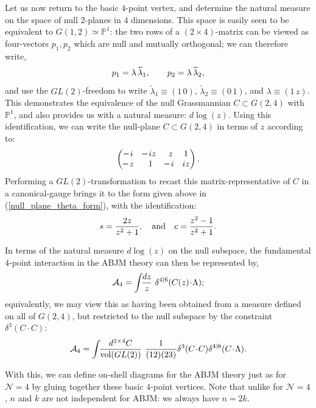 \documentclass[12pt,hyperref,compress]{JHEP3}
\newcommand{\eq}[1]{\begin{equation}#1\end{equation}}
\newcommand{\mi}{{\rm\rule[2.4pt]{6pt}{0.65pt}}}
\begin{document}
Let us now return to the basic $4$-point vertex, and determine the natural measure on the space of null $2$-planes in $4$ dimensions. This space is easily seen to be equivalent to $G(1,2)\simeq\mathbb{P}^1$: the two rows of a $(2\!\times\!4)$-matrix can be viewed as four-vectors $p_1, p_2$ which are null and mutually orthogonal; we can therefore write,
\vspace{-.2cm}\eq{p_1=\lambda\,\widetilde\lambda_1,\qquad p_2=\lambda\,\widetilde\lambda_2,\vspace{-.2cm}}
and use the $GL(2)$-freedom to write $\widetilde\lambda_1\equiv(1\,0)$, $\widetilde\lambda_2\equiv(0\,1)$, and $\lambda\equiv(1\,z)$. This demonstrates the equivalence of the null Grassmannian $C\!\subset\!G(2,4)$ with $\mathbb{P}^1$, and also provides us with a natural measure: $d\!\log(z)$. Using this identification, we can write the null-plane $C\!\subset\!G(2,4)$ in terms of $z$ according to:
\vspace{-.2cm}\eq{\left(\begin{array}{@{}cccc@{}}\mi\,i&\mi\,iz&\,\,z&1\\\mi\,z&\,\,1&\mi\,i&iz\end{array}\right).\vspace{-.2cm}}
Performing a $GL(2)$-transformation to recast this matrix-representative of $C$ in a canonical-gauge brings it to the form given above in (\ref{null_plane_theta_form}), with the identification:
\vspace{-.4cm}\eq{s=\frac{2z}{z^2+1},\quad\mathrm{and}\quad c=\frac{z^2-1}{z^2+1}.\vspace{-.1cm}}

In terms of the natural measure $d\!\log(z)$ on the null subspace, the fundamental $4$-point interaction in the ABJM theory can then be represented by,
\vspace{-.2cm}\eq{{\cal A}_4 = \int\!\!\frac{dz}{z}\,\,\delta^{4|6}(C(z)\!\cdot\!\Lambda);\vspace{-.1cm}}
equivalently, we may view this as having been obtained from a measure defined on all of $G(2,4)$, but restricted to the null subspace by the constraint $\delta^{3}(C\!\cdot\!C)$:
\vspace{-.2cm}\eq{{\cal A}_4 = \int\!\!\frac{d^{2 \times 4} C}{\mathrm{vol}(GL(2))}\,\,\frac{1}{(12)(23)} \delta^3(C\!\cdot\!C) \delta^{4|6}(C\!\cdot\!\Lambda).\vspace{-.1cm}\label{abjm_four_point}}


With this, we can define on-shell diagrams for the ABJM theory just as for $\mathcal{N}\!=\!4$ by gluing together these basic $4$-point vertices. Note that unlike for $\mathcal{N}\!=\!4$, $n$ and $k$ are not independent for ABJM: we always have $n\!=\!2k$.
\end{document}
